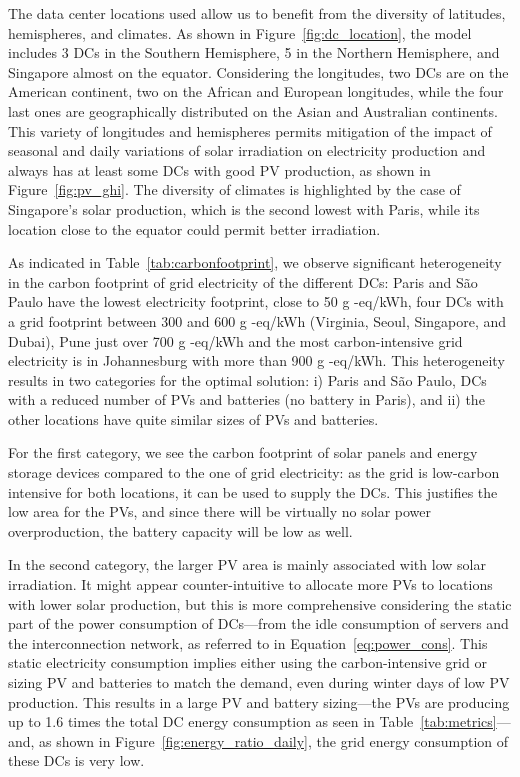 The data center locations used allow us to benefit from the diversity of latitudes, hemispheres, and climates. As shown in Figure~\ref{fig:dc_location}, the model includes 3 DCs in the Southern Hemisphere, 5 in the Northern Hemisphere, and Singapore almost on the equator. Considering the longitudes, two DCs are on the American continent, two on the African and European longitudes, while the four last ones are geographically distributed on the Asian and Australian continents. This variety of longitudes and hemispheres permits mitigation of the impact of seasonal and daily variations of solar irradiation on electricity production and always has at least some DCs with good PV production, as shown in Figure~\ref{fig:pv_ghi}. The diversity of climates is highlighted by the case of Singapore's solar production, which is the second lowest with Paris, while its location close to the equator could permit better irradiation.

As indicated in Table~\ref{tab:carbonfootprint}, we observe significant heterogeneity in the carbon footprint of grid electricity of the different DCs: Paris and S\~ao Paulo have the lowest electricity footprint, close to 50 g -eq/kWh, four DCs with a grid footprint between 300 and 600 g -eq/kWh (Virginia, Seoul, Singapore, and Dubai), Pune just over 700 g -eq/kWh and the most carbon-intensive grid electricity is in Johannesburg with more than 900 g -eq/kWh. This heterogeneity results in two categories for the optimal solution: i) Paris and S\~ao Paulo, DCs with a reduced number of PVs and batteries (no battery in Paris), and ii) the other locations have quite similar sizes of PVs and batteries. 

For the first category, we see the carbon footprint of solar panels and energy storage devices compared to the one of grid electricity: as the grid is low-carbon intensive for both locations, it can be used to supply the DCs. This justifies the low area for the PVs, and since there will be virtually no solar power overproduction, the battery capacity will be low as well. 

In the second category, the larger PV area is mainly associated with low solar irradiation. It might appear counter-intuitive to allocate more PVs to locations with lower solar production, but this is more comprehensive considering the static part of the power consumption of DCs---from the idle consumption of servers and the interconnection network, as referred to in Equation~\eqref{eq:power_cons}. This static electricity consumption implies either using the carbon-intensive grid or sizing PV and batteries to match the demand, even during winter days of low PV production. This results in a large PV and battery sizing---the PVs are producing up to 1.6 times the total DC energy consumption as seen in Table~\ref{tab:metrics}---and, as shown in Figure~\ref{fig:energy_ratio_daily}, the grid energy consumption of these DCs is very low.


